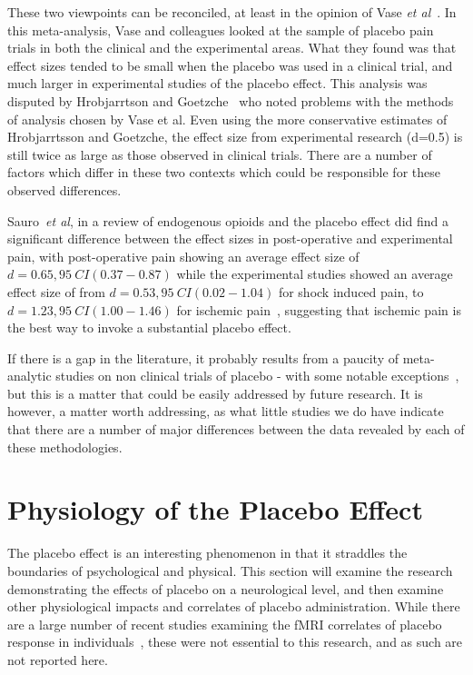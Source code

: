 These two viewpoints can be reconciled, at least in the opinion of Vase \textit{et al}~\cite{Vase2002}. In this meta-analysis, Vase and colleagues looked at the sample of placebo pain trials in both the clinical  and  the experimental areas. What they found was that effect sizes tended to be small when the placebo was used in a clinical trial, and much larger in experimental studies of the placebo effect. This analysis was disputed by Hrobjarrtson and Goetzche~\cite{hrobjartsson2003} who noted problems with the methods of analysis chosen by Vase et al. Even using the more conservative estimates of Hrobjarrtsson and Goetzche, the effect size from experimental research (d=0.5) is still twice as large as those observed in clinical trials. There are a number of factors which differ in these two contexts which could be responsible for these observed differences.  

Sauro~\textit{et al}, in a review of endogenous opioids and the placebo effect did find a significant difference between the effect sizes in post-operative and experimental pain, with post-operative pain showing an average effect size of $d=0.65, 95~CI(0.37-0.87)$ while the experimental studies showed an average effect size of from $d=0.53, 95~CI(0.02-1.04)$ for shock induced pain, to $d=1.23, 95~CI(1.00-1.46)$ for ischemic pain~\cite{Sauro2005}, suggesting that ischemic pain is the best way to invoke a substantial placebo effect.


If there is a gap in the literature, it probably results from a paucity of meta-analytic studies on non clinical trials of placebo - with some notable exceptions~\cite{Wampol2007,Vase2002}, but this is a matter that could be easily addressed by future research. It is however, a matter worth addressing, as what little studies we do have indicate that there are a number of major differences between the data revealed by each of these methodologies. 






\section{Physiology of the Placebo Effect}
\label{sec:neur-plac-effect}


The placebo effect is an interesting phenomenon in that it straddles the boundaries of psychological and physical. This section will examine the research demonstrating the effects of placebo on a neurological level, and then examine other physiological impacts and correlates of placebo administration. While there are a large number of recent studies examining the fMRI correlates of placebo response in individuals~\cite{Benedetti2005a}, these were not essential to this research, and as such are not reported here. 


